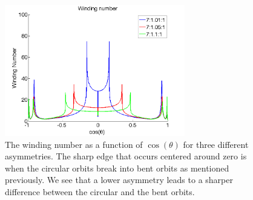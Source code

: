 \begin{figure}[H]
\begin{center}
\includegraphics[width=0.7\textwidth]{figures/theory/WindingTrend.png}
\end{center}
\caption{The winding number as a function of $\cos(\theta)$ for three different asymmetries. The sharp edge that occurs centered around zero is when the circular orbits break into bent orbits as mentioned previously. We see that a lower asymmetry leads to a sharper difference between the circular and the bent orbits.}
\label{fig:windingdifferent}
\end{figure}
